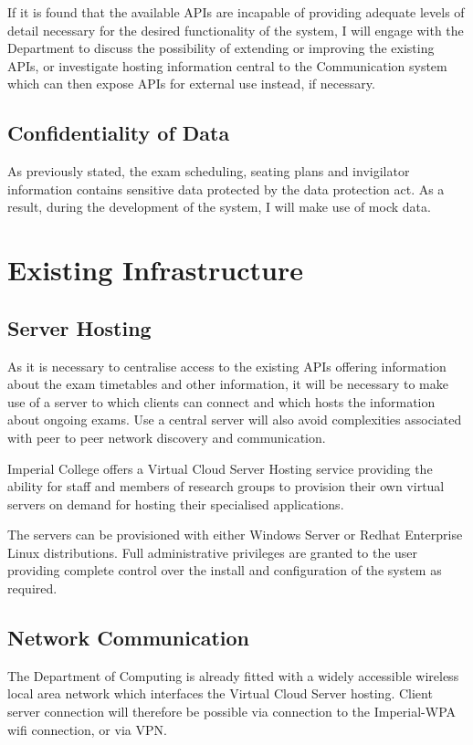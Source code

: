 \documentclass[a4paper, 12pt, notitlepage]{report}
\begin{document}
If it is found that the available APIs are incapable of providing adequate levels of detail necessary for the desired functionality of the system, I will engage with the Department to discuss the possibility of extending or improving the existing APIs, or investigate hosting information central to the Communication system which can then expose APIs for external use instead, if necessary.

\subsection{Confidentiality of Data}

As previously stated, the exam scheduling, seating plans and invigilator information contains sensitive data protected by the data protection act.  As a result, during the development of the system, I will make use of mock data.

\section{Existing Infrastructure}

\subsection{Server Hosting}
As it is necessary to centralise access to the existing APIs offering information about the exam timetables and other information, it will be necessary to make use of a server to which clients can connect and which hosts the information about ongoing exams.  Use a central server will also avoid complexities associated with peer to peer network discovery and communication.

Imperial College offers a Virtual Cloud Server Hosting service providing the ability for staff and members of research groups to provision their own virtual servers on demand for hosting their specialised applications.

The servers can be provisioned with either Windows Server or Redhat Enterprise Linux distributions.  Full administrative privileges are granted to the user providing complete control over the install and configuration of the system as required. 

\subsection{Network Communication}

The Department of Computing is already fitted with a widely accessible wireless local area network which interfaces the Virtual Cloud Server hosting.  Client server connection will therefore be possible via connection to the Imperial-WPA wifi connection, or via VPN.
\end{document}
